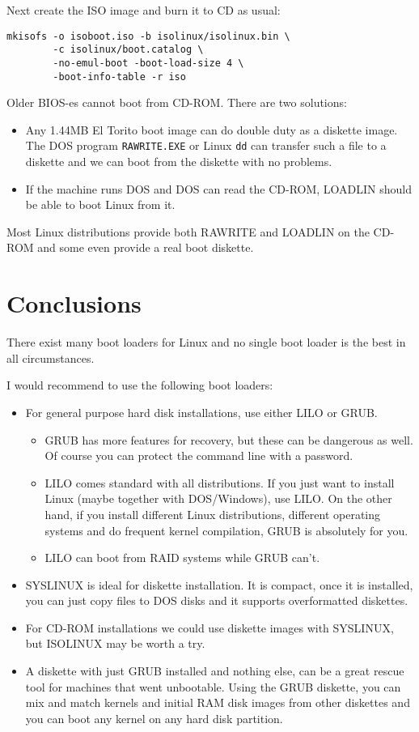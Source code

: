 \documentclass[12pt,a4paper]{article}
\begin{document}
Next create the ISO image and burn it to CD as usual:
\begin{verbatim}
mkisofs -o isoboot.iso -b isolinux/isolinux.bin \
        -c isolinux/boot.catalog \
        -no-emul-boot -boot-load-size 4 \
        -boot-info-table -r iso 
\end{verbatim}

Older BIOS-es cannot boot from CD-ROM. There are two solutions:
\begin{itemize}
\item Any 1.44MB El Torito boot image can do double duty as a diskette
  image. The DOS program {\tt RAWRITE.EXE} or Linux {\tt dd} can
  transfer such a file to a diskette and we can boot from the diskette
  with no problems.
\item If the machine runs DOS and DOS can read the CD-ROM, LOADLIN
  should be able to boot Linux from it.
\end{itemize}
Most Linux distributions provide both RAWRITE and LOADLIN on the
CD-ROM and some even provide a real boot diskette.

\section{Conclusions}

There exist many boot loaders for Linux and no single boot loader is
the best in all circumstances. 

I would recommend to use the following boot loaders:
\begin{itemize}
\item For general purpose hard disk installations, use either LILO or
  GRUB.
  \begin{itemize}
  \item GRUB has more features for recovery, but these can be
    dangerous as well. Of course you can protect the command line with
    a password.
  \item LILO comes standard with all distributions. If you just want
  to install Linux (maybe together with DOS/Windows), use LILO. On the
  other hand, if you install different Linux distributions, different
  operating systems and do frequent kernel compilation, GRUB is
  absolutely for you.
  \item LILO can boot from RAID systems while GRUB can't.
  \end{itemize}
\item SYSLINUX is ideal for diskette installation. It is compact, once
  it is installed, you can just copy files to DOS disks and it supports
  overformatted diskettes.
\item For CD-ROM installations we could use diskette images with
  SYSLINUX, but ISOLINUX may be worth a try.
\item A diskette with just GRUB installed and nothing else, can be a great
rescue tool for machines that went unbootable. Using the GRUB
diskette, you can mix and match kernels and initial RAM disk images
from other diskettes and you can boot any kernel on any hard disk partition.
\end{itemize}
\end{document}
